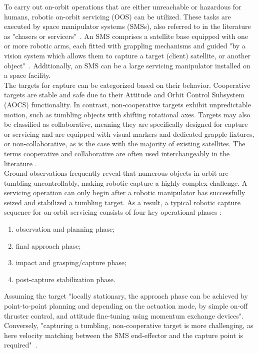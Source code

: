 \documentclass[a4paper,12pt,oneside]{report}
\begin{document}
To carry out on-orbit operations that are either unreachable or hazardous for humans, robotic on-orbit servicing (OOS) can be utilized. These tasks are executed by space manipulator systems (SMSs), also referred to in the literature as "chasers or servicers"~\cite{two}. An SMS comprises a satellite base equipped with one or more robotic arms, each fitted with grappling mechanisms and guided "by a vision system which allows them to capture a target (client) satellite, or another object"~\cite{two}. Additionally, an SMS can be a large servicing manipulator installed on a space facility.\\
The targets for capture can be categorized based on their behavior. Cooperative targets are stable and safe due to their Attitude and Orbit Control Subsystem (AOCS) functionality. In contrast, non-cooperative targets exhibit unpredictable motion, such as tumbling objects with shifting rotational axes. Targets may also be classified as collaborative, meaning they are specifically designed for capture or servicing and are equipped with visual markers and dedicated grapple fixtures, or non-collaborative, as is the case with the majority of existing satellites. The terms cooperative and collaborative are often used interchangeably in the literature \cite{two}.\\
Ground observations frequently reveal that numerous objects in orbit are tumbling uncontrollably, making robotic capture a highly complex challenge. A servicing operation can only begin after a robotic manipulator has successfully seized and stabilized a tumbling target. As a result, a typical robotic capture sequence for on-orbit servicing consists of four key operational phases \cite{two}:
\begin{enumerate}
  \item observation and planning phase;
  \item final approach phase;
  \item impact and grasping/capture phase;
  \item post-capture stabilization phase.
\end{enumerate}
Assuming the target "locally stationary, the approach phase can be achieved by point-to-point planning and depending on the actuation mode, by simple on-off thruster control, and attitude fine-tuning using momentum exchange devices"\cite{two}. Conversely, "capturing a tumbling, non-cooperative target is more challenging, as here velocity matching between the SMS end-effector and the capture point is required"~\cite{two}.\\
\end{document}
